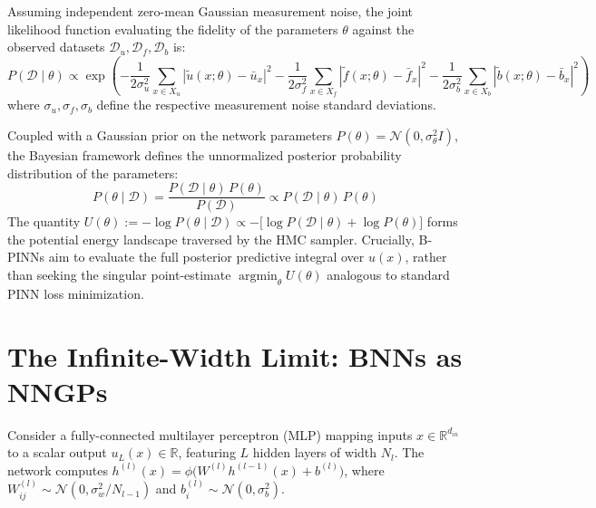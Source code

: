 \documentclass[11pt]{article}
\begin{document}
Assuming independent zero-mean Gaussian measurement noise, the joint likelihood function evaluating the fidelity of the parameters $\theta$ against the observed datasets $\mathcal{D}_u, \mathcal{D}_f, \mathcal{D}_b$ is:
\begin{equation}
P(\mathcal D\mid \theta)\propto \exp\left(
-\frac{1}{2\sigma_u^2}\sum_{x \in X_u} | \tilde u(x;\theta)-\bar u_x|^2
-\frac{1}{2\sigma_f^2}\sum_{x \in X_f}| \tilde f(x;\theta)-\bar f_x|^2
-\frac{1}{2\sigma_b^2}\sum_{x \in X_b}| \tilde b(x;\theta)-\bar b_x|^2
\right)
\end{equation}
where $\sigma_u, \sigma_f, \sigma_b$ define the respective measurement noise standard deviations. 

Coupled with a Gaussian prior on the network parameters $P(\theta) = \mathcal{N}(0, \sigma_\theta^2 I)$, the Bayesian framework defines the unnormalized posterior probability distribution of the parameters:
\begin{equation}
P(\theta\mid \mathcal D) = \frac{P(\mathcal D\mid \theta)\,P(\theta)}{P(\mathcal D)} \propto P(\mathcal D\mid \theta)\,P(\theta)
\end{equation}
The quantity $U(\theta) := -\log P(\theta\mid \mathcal D) \propto -\big[\log P(\mathcal D\mid \theta) + \log P(\theta)\big]$ forms the potential energy landscape traversed by the HMC sampler. Crucially, B-PINNs aim to evaluate the full posterior predictive integral over $u(x)$, rather than seeking the singular point-estimate $\operatorname*{argmin}_\theta U(\theta)$ analogous to standard PINN loss minimization.

\section{The Infinite-Width Limit: BNNs as NNGPs}

Consider a fully-connected multilayer perceptron (MLP) mapping inputs $x \in \mathbb{R}^{d_{in}}$ to a scalar output $u_L(x) \in \mathbb{R}$, featuring $L$ hidden layers of width $N_l$. The network computes $h^{(l)}(x) = \phi\big(W^{(l)} h^{(l-1)}(x) + b^{(l)}\big)$, where $W^{(l)}_{ij} \sim \mathcal{N}(0, \sigma_w^2 / N_{l-1})$ and $b^{(l)}_i \sim \mathcal{N}(0, \sigma_b^2)$.
\end{document}
